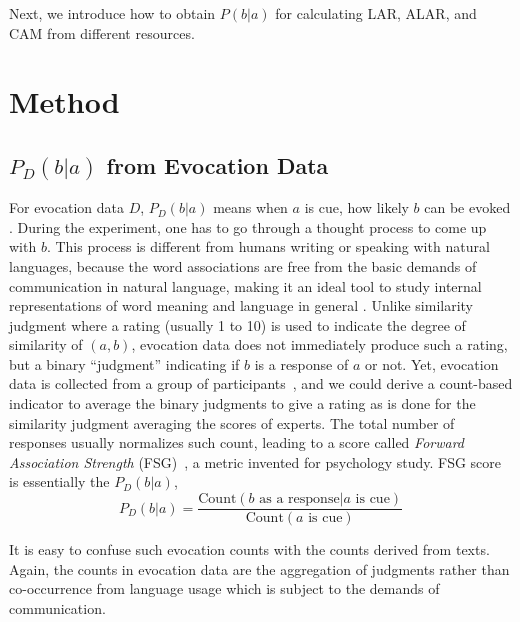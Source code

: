 \documentclass[letterpaper]{article} %
\begin{document}
Next, we introduce how to obtain $P(b|a)$ for calculating LAR, ALAR, and CAM from different resources.

\section{Method} \label{sec:pba}

\subsection{$P_D(b|a)$ from Evocation Data}
For evocation data $D$, $P_D(b|a)$ means when $a$ is cue, how likely $b$ can be evoked \cite{kiss1973associative}. During the experiment, one has to go through a thought process to come up with $b$. This process is different from  humans writing or speaking with natural languages, because the word associations are free from the basic demands of communication in natural language, making it an ideal tool to study internal representations of word meaning and language in general \cite{de2019small}. Unlike similarity judgment where a rating (usually 1 to 10) is used to indicate the degree of similarity of $(a,b)$, evocation data does not immediately produce such a rating, but a binary ``judgment'' indicating if $b$ is a response of $a$ or not. Yet, evocation data is collected from a group of participants~\citep{de2019small,nelson2004university}, and we could derive a count-based indicator to average the binary judgments to give a rating as is done for the similarity judgment averaging the scores of experts. The total number of responses usually normalizes such count, leading to a score called \textit{Forward Association Strength} (FSG)~\citep{nelson2004university}, a metric invented for psychology study. FSG score is essentially the $P_D(b|a)$,
\begin{equation}
    P_D(b|a) = \frac{ \text{Count}(b \mbox{ as a response} | a \mbox{ is cue}) } { \text{Count} (a \mbox{ is cue})}
\end{equation}

It is easy to confuse such evocation counts with the counts derived from texts. Again, the counts in evocation data are the aggregation of judgments \cite{de2019small} rather than co-occurrence from language usage which is subject to the demands of communication.
\end{document}
